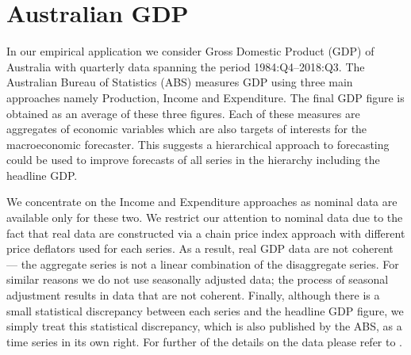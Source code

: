 \documentclass[graybox]{svmult}
\begin{document}

\section{Australian GDP}\label{sec:data}

In our empirical application we consider Gross Domestic Product (GDP) of Australia with quarterly data spanning the period 1984:Q4--2018:Q3. The Australian Bureau of Statistics (ABS) measures GDP using three main approaches namely Production, Income and Expenditure. The final GDP figure is obtained as an average of these three figures. Each of these measures are aggregates of economic variables which are also targets of interests for the macroeconomic forecaster. This suggests a hierarchical approach to forecasting could be used to improve forecasts of all series in the hierarchy including the headline GDP.

We concentrate on the Income and Expenditure approaches as nominal data are available only for these two. We restrict our attention to nominal data due to the fact that real data are constructed via a chain price index approach with different price deflators used for each series. As a result, real GDP data are not coherent --- the aggregate series is not a linear combination of the disaggregate series. For similar reasons we do not use seasonally adjusted data; the process of seasonal adjustment results in data that are not coherent. Finally, although there is a small statistical discrepancy between each series and the headline GDP figure, we simply treat this statistical discrepancy, which is also published by the ABS, as a time series in its own right. For further of the details on the data please refer to \citet{ABS2018}.
\end{document}
